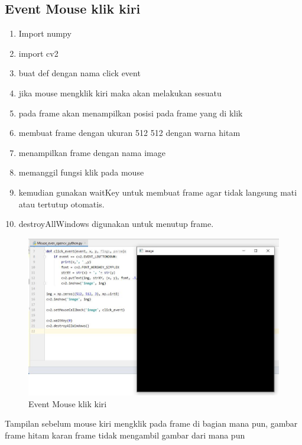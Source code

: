 \newpage
\subsection{Event Mouse klik kiri}

\begin{enumerate}
	\item Import numpy
	\item import cv2
	\item buat def dengan nama click event
	\item jika mouse mengklik kiri maka akan melakukan sesuatu
	\item pada frame akan menampilkan posisi pada frame yang di klik
	\item membuat frame dengan ukuran 512 512 dengan warna hitam
	\item menampilkan frame dengan nama image
	\item memanggil fungsi klik pada mouse
	\item kemudian gunakan waitKey untuk membuat frame agar tidak langsung mati atau tertutup otomatis.
	\item destroyAllWindows digunakan untuk menutup frame.
\end{enumerate}

\newpage
\begin{figure}[ht]
\centering
\includegraphics[scale=0.5]{figures/2,20.jpg}
\caption{Event Mouse klik kiri}
\label{contoh}
\end{figure}
Tampilan sebelum mouse kiri mengklik pada frame di bagian mana pun, gambar frame hitam karan frame tidak mengambil gambar dari mana pun

